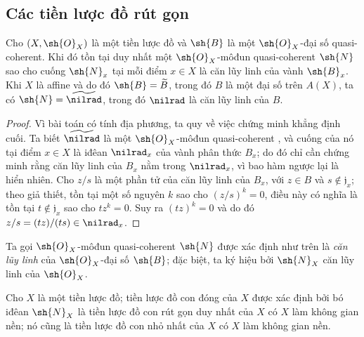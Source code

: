 \documentclass[oneside]{amsart}
\newcommand{\oldpage}[2][]{{\marginnote{\normalfont\textbf{#1}~|~#2}}\ignorespaces}
\let\EGAOriginalLabel\label
\renewcommand{\label}[1]{\phantomsection\EGAOriginalLabel{#1}}
\begin{document}
\subsection{Các tiền lược đồ rút gọn}
\label{subsection:I.5.1}

\begin{proposition}[5.1.1]
\label{I.5.1.1}
Cho $(X,\sh{O}_X)$ là một tiền lược đồ và $\sh{B}$ là một $\sh{O}_X$-đại số quasi-coherent.
Khi đó tồn tại duy nhất một $\sh{O}_X$-môđun quasi-coherent $\sh{N}$ sao cho cuống $\sh{N}_x$ tại mỗi điểm $x\in X$ là căn lũy linh của vành $\sh{B}_x$.
Khi $X$ là affine và do đó $\sh{B}=\widetilde{B}$, trong đó $B$ là một đại số trên $A(X)$, ta có $\sh{N}=\widetilde{\nilrad}$, trong đó $\nilrad$ là căn lũy linh của $B$.
\end{proposition}

\begin{proof}
\oldpage[I]{128}
Vì bài toán có tính địa phương, ta quy về việc chứng minh khẳng định cuối.
Ta biết $\widetilde{\nilrad}$ là một $\sh{O}_X$-môđun quasi-coherent , và cuống của nó tại điểm $x\in X$ là iđêan $\nilrad_x$ của vành phân thức $B_x$;
do đó chỉ cần chứng minh rằng căn lũy linh của $B_x$ nằm trong $\nilrad_x$, vì bao hàm ngược lại là hiển nhiên.
Cho $z/s$ là một phần tử của căn lũy linh của $B_x$, với $z\in B$ và $s\not\in\mathfrak{j}_x$;
theo giả thiết, tồn tại một số nguyên $k$ sao cho $(z/s)^k=0$, điều này có nghĩa là tồn tại $t\not\in\mathfrak{j}_x$ sao cho $tz^k=0$.
Suy ra $(tz)^k=0$ và do đó $z/s=(tz)/(ts)\in\nilrad_x$.
\end{proof}

Ta gọi $\sh{O}_X$-môđun quasi-coherent $\sh{N}$ được xác định như trên là \emph{căn lũy linh} của $\sh{O}_X$-đại số $\sh{B}$; đặc biệt, ta ký hiệu bởi $\sh{N}_X$ căn lũy linh của $\sh{O}_X$.

\begin{corollary}[5.1.2]
\label{I.5.1.2}
Cho $X$ là một tiền lược đồ;
tiền lược đồ con đóng của $X$ được xác định bởi bó iđêan $\sh{N}_X$ là tiền lược đồ con rút gọn duy nhất  của $X$ có $X$ làm không gian nền;
nó cũng là tiền lược đồ con nhỏ nhất của $X$ có $X$ làm không gian nền.
\end{corollary}
\end{document}
